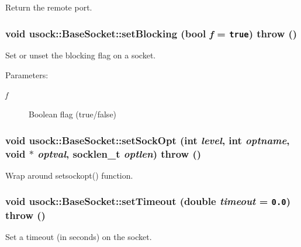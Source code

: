 Return the remote port. 

\hypertarget{classusock_1_1BaseSocket_143722edec56e119495fb8ded76582e5}{
\subsubsection[{setBlocking}]{\setlength{\rightskip}{0pt plus 5cm}void usock::BaseSocket::setBlocking (bool {\em f} = {\tt true})  throw ()}}
\label{classusock_1_1BaseSocket_143722edec56e119495fb8ded76582e5}


Set or unset the blocking flag on a socket. 

\begin{Desc}
\item[Parameters:]
\begin{description}
\item[{\em f}]Boolean flag (true/false) \end{description}
\end{Desc}
\hypertarget{classusock_1_1BaseSocket_d0444de98899e9312bfa320d5a359e07}{
\subsubsection[{setSockOpt}]{\setlength{\rightskip}{0pt plus 5cm}void usock::BaseSocket::setSockOpt (int {\em level}, \/  int {\em optname}, \/  void $\ast$ {\em optval}, \/  socklen\_\-t {\em optlen})  throw ()}}
\label{classusock_1_1BaseSocket_d0444de98899e9312bfa320d5a359e07}


Wrap around setsockopt() function. 

\hypertarget{classusock_1_1BaseSocket_e31552b42df68bc68fe557caf6e75128}{
\subsubsection[{setTimeout}]{\setlength{\rightskip}{0pt plus 5cm}void usock::BaseSocket::setTimeout (double {\em timeout} = {\tt 0.0})  throw ()}}
\label{classusock_1_1BaseSocket_e31552b42df68bc68fe557caf6e75128}


Set a timeout (in seconds) on the socket. 

